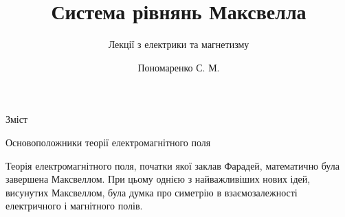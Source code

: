 \documentclass{beamer}
\title[Лекції електрики та магнетизму]{\huge\bfseries Система рівнянь Максвелла}
\subtitle{Лекції з електрики та магнетизму}
\author{Пономаренко С. М.}
\date{}
\begin{document}
\begin{frame}[plain]
	\maketitle
\end{frame}

\begin{frame}{Зміст}{}
	\tableofcontents
\end{frame}




\begin{frame}{Основоположники теорії електромагнітного поля}{}
	\begin{block}{}\justifying
		Теорія електромагнітного поля, початки якої заклав \alert{Фарадей}, математично була завершена \alert{Максвеллом}. При цьому однією з найважливіших
		нових ідей, висунутих Максвеллом, була думка про симетрію в взаємозалежності електричного і магнітного полів.
	\end{block}


\end{frame}
\end{document}
